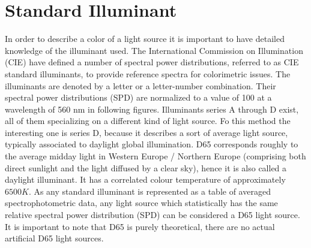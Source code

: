 \section{Standard Illuminant}
In order to describe a color of a light source it is important to have detailed knowledge of the illuminant used. The International Commission on Illumination (CIE)  have defined a number of spectral power distributions, referred to as CIE standard illuminants, to provide reference spectra for colorimetric issues. The illuminants are denoted by a letter or a letter-number combination. Their spectral power distributions (SPD) are normalized to a value of 100 at a wavelength of 560 nm in following figures. Illuminants series A through D exist, all of them specializing on a different kind of light source. Fo this method the interesting one is series D, because it describes a sort of average light source, typically associated to daylight global illumination.\newline
D65 corresponds roughly to the average midday light in Western Europe / Northern Europe (comprising both direct sunlight and the light diffused by a clear sky), hence it is also called a daylight illuminant. It has a correlated colour temperature of approximately $6500 K$. As any standard illuminant is represented as a table of averaged spectrophotometric data, any light source which statistically has the same relative spectral power distribution (SPD) can be considered a D65 light source. It is important to note that D65 is purely theoretical, there are no actual artificial D65 light sources.\cite{DeeSixFive}